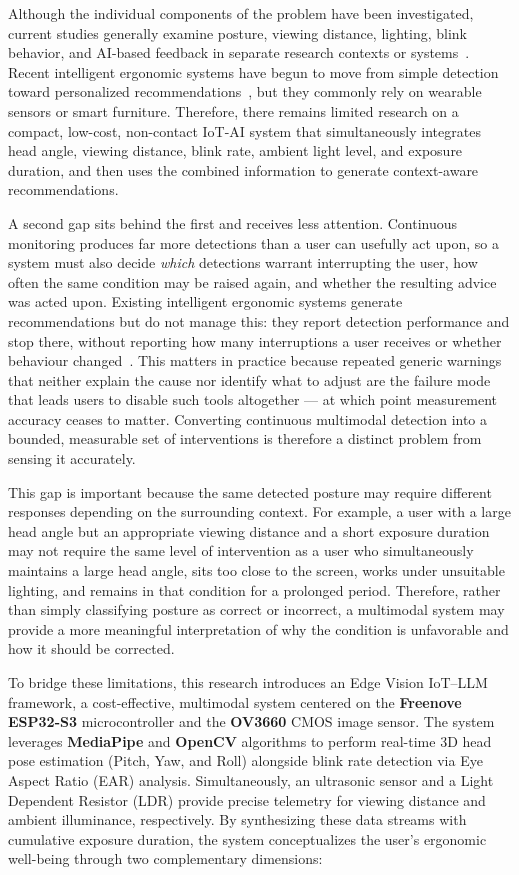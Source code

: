 Although the individual components of the problem have been investigated, current studies generally examine posture, viewing distance, lighting, blink behavior, and AI-based feedback in separate research contexts or systems~\cite{ref4,ref7,ref10,ref14,ref15,ref16}. Recent intelligent ergonomic systems have begun to move from simple detection toward personalized recommendations~\cite{ref14,ref15}, but they commonly rely on wearable sensors or smart furniture. Therefore, there remains limited research on a compact, low-cost, non-contact IoT-AI system that simultaneously integrates head angle, viewing distance, blink rate, ambient light level, and exposure duration, and then uses the combined information to generate context-aware recommendations.

A second gap sits behind the first and receives less attention. Continuous monitoring produces far more detections than a user can usefully act upon, so a system must also decide \emph{which} detections warrant interrupting the user, how often the same condition may be raised again, and whether the resulting advice was acted upon. Existing intelligent ergonomic systems generate recommendations but do not manage this: they report detection performance and stop there, without reporting how many interruptions a user receives or whether behaviour changed~\cite{ref14,ref15}. This matters in practice because repeated generic warnings that neither explain the cause nor identify what to adjust are the failure mode that leads users to disable such tools altogether --- at which point measurement accuracy ceases to matter. Converting continuous multimodal detection into a bounded, measurable set of interventions is therefore a distinct problem from sensing it accurately.

This gap is important because the same detected posture may require different responses depending on the surrounding context. For example, a user with a large head angle but an appropriate viewing distance and a short exposure duration may not require the same level of intervention as a user who simultaneously maintains a large head angle, sits too close to the screen, works under unsuitable lighting, and remains in that condition for a prolonged period. Therefore, rather than simply classifying posture as correct or incorrect, a multimodal system may provide a more meaningful interpretation of why the condition is unfavorable and how it should be corrected.

To bridge these limitations, this research introduces an Edge Vision IoT--LLM framework, a cost-effective, multimodal system centered on the \textbf{Freenove ESP32-S3} microcontroller and the \textbf{OV3660} CMOS image sensor. The system leverages \textbf{MediaPipe} and \textbf{OpenCV} algorithms to perform real-time 3D head pose estimation (Pitch, Yaw, and Roll) alongside blink rate detection via Eye Aspect Ratio (EAR) analysis. Simultaneously, an ultrasonic sensor and a Light Dependent Resistor (LDR) provide precise telemetry for viewing distance and ambient illuminance, respectively. By synthesizing these data streams with cumulative exposure duration, the system conceptualizes the user's ergonomic well-being through two complementary dimensions:

